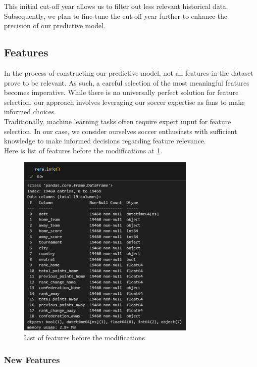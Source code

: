 \documentclass[a4paper,12pt]{article}
\begin{document}
This initial cut-off year allows us to filter out less relevant historical data. Subsequently, we plan to fine-tune the cut-off year further to enhance the precision of our predictive model.


\subsection{Features}

In the process of constructing our predictive model, not all features in the dataset prove to be relevant. As such, a careful selection of the most meaningful features becomes imperative. While there is no universally perfect solution for feature selection, our approach involves leveraging our soccer expertise as fans to make informed choices.\\

Traditionally, machine learning tasks often require expert input for feature selection. In our case, we consider ourselves soccer enthusiasts with sufficient knowledge to make informed decisions regarding feature relevance.\\

Here is list of features before the modifications at \ref{fig:features_b4_modifications}.

\begin{figure}
  \centering
  \includegraphics[height=9cm]{./images/features_b4_modifications.png}
  \caption{List of features before the modifications}
  \label{fig:features_b4_modifications}
\end{figure}

\subsubsection{New Features}
\end{document}
